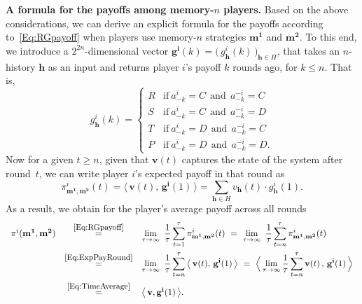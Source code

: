 \documentclass[9pt,twoside,lineno]{pnas-new}
\theoremstyle{plainCl1}
\theoremstyle{plainCl2}
\begin{document}
\noindent
{\bf A formula for the payoffs among memory-$n$ players.} Based on the above considerations, we can derive an explicit formula for the payoffs according to~\eqref{Eq:RGpayoff} when players use memory-$n$ strategies $\mathbf{m^1}$ and $\mathbf{m^2}$. 
To this end, we introduce a $2^{2n}$-dimensional vector $\mathbf{g^i}(k)\!=\!\big(\,g^i_\mathbf{h}(k)\,\big)_{\mathbf{h}\in H}$, that takes an $n$-history $\mathbf{h}$ as an input and returns player $i$'s payoff $k$ rounds ago, for $k\!\le\!n$. 
That is, 
\begin{equation}\label{Eq:g(k)}
    g_\mathbf{h}^i(k) = \left\{
    \begin{array}{cl}
    R	&\text{if}~ a_{-k}^i\!=\!C~~\text{and}~~a_{-k}^{-i}\!=\!C\\[0.1cm]
    S	&\text{if}~ a_{-k}^i\!=\!C~~\text{and}~~ a_{-k}^{-i}\!=\!D\\[0.1cm]
    T	&\text{if}~ a_{-k}^i\!=\!D~~\text{and}~~ a_{-k}^{-i}\!=\!C\\[0.1cm]
    P	&\text{if}~ a_{-k}^i\!=\!D~~\text{and}~~ a_{-k}^{-i}\!=\!D.
    \end{array}
    \right.
\end{equation}
Now for a given $t\!\ge\!n$, given that  $\mathbf{v}(t)$ captures the state of the system after round~$t$, we can write player $i$'s expected payoff in that round as
\begin{equation} \label{Eq:ExpPayRound}
\pi^i_{\mathbf{m^1},\mathbf{m^2}}(t) = \big\langle \,\mathbf{v}(t),\, \mathbf{g^i}(1)\,\big\rangle = \sum_{\mathbf{h}\in H} v_\mathbf{h}(t) \cdot g^i_\mathbf{h}(1). 
\end{equation}
As a result, we obtain for the player's average payoff across all rounds
\begin{equation} \label{Eq:PayoffMemoryn}
\begin{array}{rcl}
\pi^i(\mathbf{m^1},\mathbf{m^2}) 
&\stackrel{\mbox{\small \eqref{Eq:RGpayoff}}}{=}  
&\displaystyle \lim_{\tau \to \infty}~ \frac{1}{\tau} \sum_{t=1}^{\tau} \pi^i_{\mathbf{m^1},\mathbf{m^2}}(t)
~=~
\lim_{\tau \to \infty}~ \frac{1}{\tau} \sum_{t=n}^{\tau} \pi^i_{\mathbf{m^1},\mathbf{m^2}}(t)\\[0.5cm]
&\stackrel{\mbox{\small \eqref{Eq:ExpPayRound}}}{=}  
&\displaystyle \lim_{\tau \to \infty}~ \frac{1}{\tau} \sum_{t=n}^{\tau}\big\langle \,\mathbf{v}(t),\, \mathbf{g^i}(1)\,\big\rangle
~=~
\Big\langle \lim_{\tau \to \infty} \frac{1}{\tau} \sum_{t=n}^{\tau} \mathbf{v}(t)\, , \, \mathbf{g^i}(1)\,\Big\rangle\\[0.5cm]
&\stackrel{\mbox{\small \eqref{Eq:TimeAverage}}}{=}  
&\big\langle\, \mathbf{v}, \mathbf{g^i}(1)\,\big\rangle .
\end{array}
\end{equation}
\end{document}
